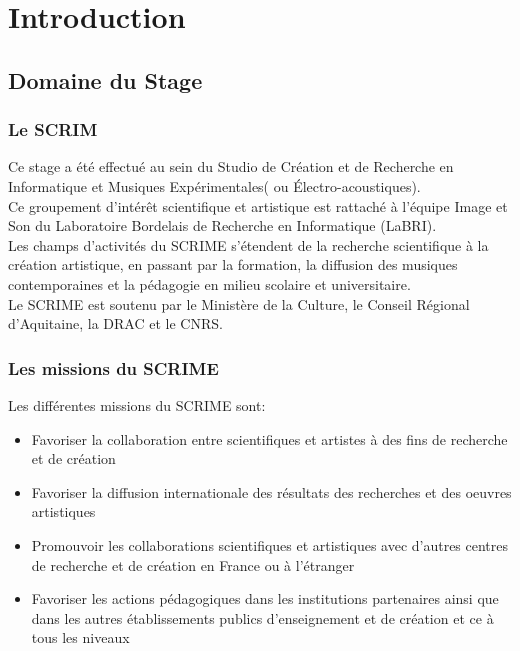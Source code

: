 \documentclass[a4paper, 12pt]{report}
\begin{document}
\tableofcontents %

\chapter{Introduction}
\section{Domaine du Stage}
\subsection{Le SCRIM}
Ce stage a été effectué au sein du Studio de Création et de Recherche en Informatique et Musiques Expérimentales( ou Électro-acoustiques).\\
Ce groupement d'intérêt scientifique et artistique est rattaché à l'équipe Image et Son du Laboratoire Bordelais de Recherche en Informatique (LaBRI).\\
Les champs d'activités du SCRIME s'étendent de la recherche scientifique à la création artistique, en passant par la formation, la diffusion des musiques contemporaines et la pédagogie en milieu scolaire et universitaire. \\
Le SCRIME est soutenu par le Ministère de la Culture, le Conseil Régional d'Aquitaine, la DRAC et le CNRS.\\

\subsection{Les missions du SCRIME}
Les différentes missions du SCRIME sont:
\begin{itemize}
\item Favoriser la collaboration entre scientifiques et artistes à des fins de recherche et de création
\item Favoriser la diffusion internationale des résultats des recherches et des oeuvres artistiques
\item Promouvoir les collaborations scientifiques et artistiques avec d'autres centres de recherche et de création en France ou à l'étranger
\item Favoriser les actions pédagogiques dans les institutions partenaires ainsi que dans les autres établissements publics d'enseignement et de création et ce à tous les niveaux 
\end{itemize}
\end{document}
